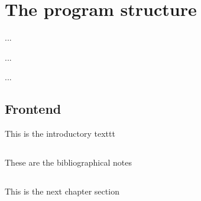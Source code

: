%
%

\chapter{The program structure}

\begin{FraseCelebre}
\begin{Frase}
...
\end{Frase}
\begin{Fuente}
...
\end{Fuente}
\end{FraseCelebre}

\begin{resumen}
...
\end{resumen}


\section{Frontend}
\label{cap1:sec:introduccion}

This is the introductory texttt

\section*{\NotasBibliograficas}
\TocNotasBibliograficas

These are the bibliographical notes
\citep{ldesc2e}

\medskip



\section*{\ProximoCapitulo}
\TocProximoCapitulo

This is the next chapter section

